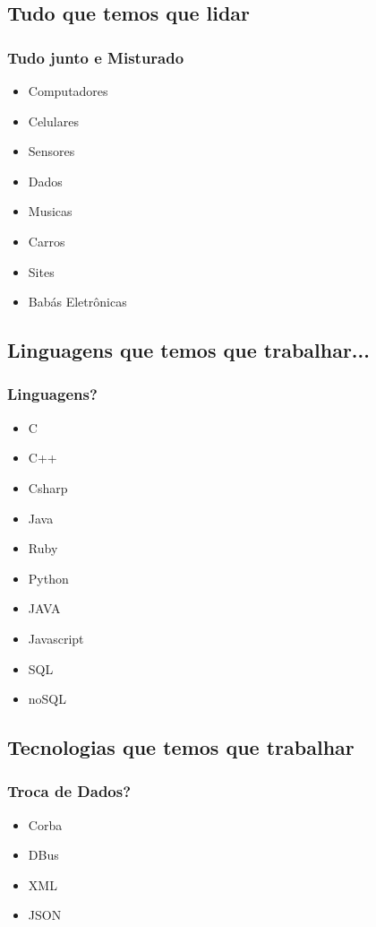 \documentclass{beamer}
\begin{document}
\subsection{Tudo que temos que lidar}

\begin{frame} \frametitle{Tudo junto e Misturado}
 \begin{itemize}
  \item Computadores
  \item Celulares
  \item Sensores
  \item Dados
  \item Musicas
  \item Carros
  \item Sites
  \item Babás Eletrônicas
 \end{itemize}
\end{frame}

\subsection{Linguagens que temos que trabalhar...}
\begin{frame} \frametitle{Linguagens?}
 \begin{itemize}
  \item C
  \item C++
  \item Csharp
  \item Java
  \item Ruby
  \item Python
  \item JAVA
  \item Javascript
  \item SQL
  \item noSQL
 \end{itemize}
\end{frame}

\subsection{Tecnologias que temos que trabalhar}
\begin{frame} \frametitle{Troca de Dados?}
    \begin{itemize}
     \item Corba
     \item DBus
     \item XML
     \item JSON
    \end{itemize}
\end{frame}
\end{document}

